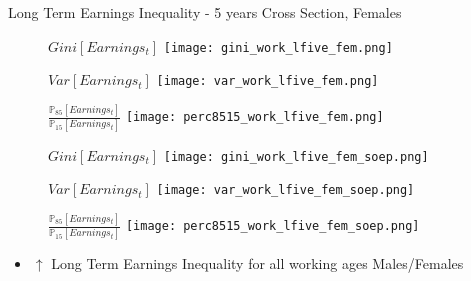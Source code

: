 \documentclass{beamer}
\begin{document}
\begin{frame}{Long Term Earnings Inequality  - 5 years Cross Section, Females }
\begin{figure}[!t]
\centering
\begin{minipage}[b]{0.32\textwidth}{$Gini[Earnings_t]$}
\centering
\texttt{[image: gini\_work\_lfive\_fem.png]}
\end{minipage}
\begin{minipage}[b]{0.32\textwidth}{$Var[Earnings_t]$}
\centering
\texttt{[image: var\_work\_lfive\_fem.png]}
\end{minipage}
\begin{minipage}[b]{0.32\textwidth}{$\frac{\mathbb{P}_{85}[Earnings_t]}{\mathbb{P}_{15}[Earnings_t]}$}
\centering
\texttt{[image: perc8515\_work\_lfive\_fem.png]}
\end{minipage}
\begin{minipage}[b]{0.32\textwidth}{$Gini[Earnings_t]$}
\centering
\texttt{[image: gini\_work\_lfive\_fem\_soep.png]}
\end{minipage}
\begin{minipage}[b]{0.32\textwidth}{$Var[Earnings_t]$}
\centering
\texttt{[image: var\_work\_lfive\_fem\_soep.png]}
\end{minipage}
\begin{minipage}[b]{0.32\textwidth}{$\frac{\mathbb{P}_{85}[Earnings_t]}{\mathbb{P}_{15}[Earnings_t]}$}
\centering
\texttt{[image: perc8515\_work\_lfive\_fem\_soep.png]}
\end{minipage}
\end{figure}
\begin{itemize}
\setlength{\itemsep}{0.7 cm}
\item $\uparrow$ Long Term Earnings Inequality for all working ages Males/Females
\end{itemize}
\end{frame}
\end{document}

